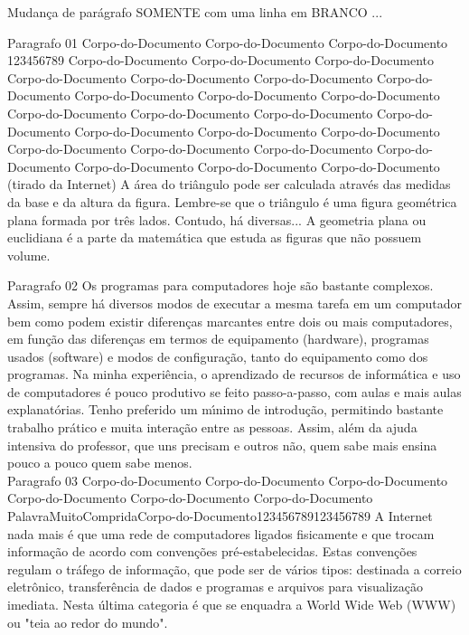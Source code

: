 \documentclass{article}    %
\begin{document}
Mudan\c{c}a de par\'{a}grafo SOMENTE com uma linha em BRANCO ...




Paragrafo 01
Corpo-do-Documento Corpo-do-Documento Corpo-do-Documento 123456789 Corpo-do-Documento Corpo-do-Documento Corpo-do-Documento
Corpo-do-Documento Corpo-do-Documento Corpo-do-Documento
Corpo-do-Documento Corpo-do-Documento Corpo-do-Documento
Corpo-do-Documento Corpo-do-Documento Corpo-do-Documento
Corpo-do-Documento Corpo-do-Documento Corpo-do-Documento
Corpo-do-Documento Corpo-do-Documento Corpo-do-Documento
Corpo-do-Documento Corpo-do-Documento Corpo-do-Documento
Corpo-do-Documento Corpo-do-Documento Corpo-do-Documento\\
(tirado da Internet) A \'{a}rea do tri\^{a}ngulo pode ser calculada atrav\'{e}s das medidas da base e da altura da figura. Lembre-se que o tri\^{a}ngulo \'{e} uma figura geom\'{e}trica plana formada por tr\^{e}s lados. Contudo, h\'{a} diversas... A geometria plana ou euclidiana \'{e} a parte da matem\'{a}tica que estuda as figuras que n\~{a}o possuem volume.




Paragrafo 02
Os programas para computadores hoje s\~{a}o bastante complexos. Assim, sempre h\'{a} diversos modos de executar a mesma tarefa em um computador bem como podem existir diferen\c{c}as marcantes entre dois ou mais computadores, em fun\c{c}\~{a}o das diferen\c{c}as em termos de equipamento (hardware), programas usados (software) e modos de configura\c{c}\~{a}o, tanto do equipamento como dos programas.
Na minha experi\^{e}ncia, o aprendizado de recursos de inform\'{a}tica e uso de computadores \'{e} pouco produtivo se feito passo-a-passo, com aulas e mais aulas explanat\'{o}rias. Tenho preferido um m\'{\i}nimo de introdu\c{c}\~{a}o, permitindo bastante trabalho pr\'{a}tico e muita intera\c{c}\~{a}o entre as pessoas. Assim, al\'{e}m da ajuda intensiva do professor, que uns precisam e outros n\~{a}o, quem sabe mais ensina pouco a pouco quem sabe menos.\\





Paragrafo 03
Corpo-do-Documento
Corpo-do-Documento
Corpo-do-Documento
Corpo-do-Documento
Corpo-do-Documento
Corpo-do-Documento
PalavraMuitoCompridaCorpo-do-Documento123456789123456789
A Internet nada mais \'{e} que uma rede de computadores ligados fisicamente e que trocam informa\c{c}\~{a}o de acordo com conven\c{c}\~{o}es pr\'{e}-estabelecidas. Estas conven\c{c}\~{o}es regulam o tr\'{a}fego de informa\c{c}\~{a}o, que pode ser de v\'{a}rios tipos: destinada a correio eletr\^{o}nico, transfer\^{e}ncia de dados e programas e arquivos para visualiza\c{c}\~{a}o imediata. Nesta \'{u}ltima categoria \'{e} que se enquadra a World Wide Web (WWW) ou "teia ao redor do mundo".
\end{document}
